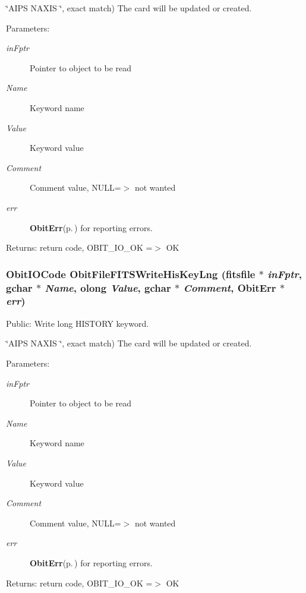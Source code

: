 \char`\"{}AIPS   NAXIS   \char`\"{}, exact match) The card will be updated or created. \begin{Desc}
\item[Parameters:]
\begin{description}
\item[{\em in\-Fptr}]Pointer to object to be read \item[{\em Name}]Keyword name \item[{\em Value}]Keyword value \item[{\em Comment}]Comment value, NULL=$>$ not wanted \item[{\em err}]{\bf Obit\-Err}{\rm (p.\,\pageref{structObitErr})} for reporting errors. \end{description}
\end{Desc}
\begin{Desc}
\item[Returns:]return code, OBIT\_\-IO\_\-OK =$>$ OK \end{Desc}
\subsubsection{\setlength{\rightskip}{0pt plus 5cm}Obit\-IOCode Obit\-File\-FITSWrite\-His\-Key\-Lng (fitsfile $\ast$ {\em in\-Fptr}, gchar $\ast$ {\em Name}, {\bf olong} {\em Value}, gchar $\ast$ {\em Comment}, {\bf Obit\-Err} $\ast$ {\em err})}\label{ObitFileFITS_8c_a32}


Public: Write long HISTORY keyword. 

\char`\"{}AIPS   NAXIS   \char`\"{}, exact match) The card will be updated or created. \begin{Desc}
\item[Parameters:]
\begin{description}
\item[{\em in\-Fptr}]Pointer to object to be read \item[{\em Name}]Keyword name \item[{\em Value}]Keyword value \item[{\em Comment}]Comment value, NULL=$>$ not wanted \item[{\em err}]{\bf Obit\-Err}{\rm (p.\,\pageref{structObitErr})} for reporting errors. \end{description}
\end{Desc}
\begin{Desc}
\item[Returns:]return code, OBIT\_\-IO\_\-OK =$>$ OK \end{Desc}
